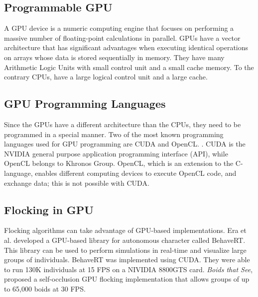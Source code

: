 \subsection{Programmable GPU}
A GPU device is a numeric computing engine\cite{GPUbook} that focuses on 
performing a massive number of floating-point calculations in parallel. 
GPUs have a vector architecture that has significant advantages when executing 
identical operations on arrays whose data is stored sequentially in memory. 
 They have many Arithmetic Logic 
Units with small control unit and a small cache memory. To the contrary CPUs, 
have a large logical control unit and a large cache. 


\subsection{GPU Programming Languages}
Since the GPUs have a different architecture than the CPUs, they need to be 
programmed in a special manner. Two of the most known programming languages used 
for GPU programming are CUDA and OpenCL. 
. 
CUDA is the NVIDIA  general purpose application programming interface (API)\cite{CUDAandOpenCL}, while OpenCL belongs to Khronos Group. 
OpenCL, which is an extension to the C-language,  enables different 
computing devices to execute OpenCL code, and exchange data; this is not 
possible with CUDA. 
 
\subsection{Flocking in GPU}\label{flockingGPU}
Flocking algorithms can take advantage of GPU-based implementations. 
Era et al. developed a GPU-based library for autonomous character called BehaveRT\cite{BehaveRT}. This library can be used to perform simulations in real-time and visualize large groups of individuals. BehaveRT was implemented using CUDA. They were able to run 130K individuals at 15 FPS on a NIVIDIA 8800GTS card. \textit{Boids that See}, proposed a self-occlusion GPU flocking implementation that allows groups of up to 65,000 boids at 30 FPS\cite{boidsThatSee}. 

